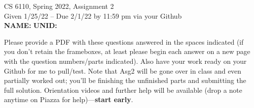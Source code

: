 \documentclass[11pt]{article}
\begin{document}



\begin{center}
\begin{large}
  CS 6110, Spring 2022, Assignment 2  \\
  Given 1/25/22 -- Due 2/1/22 by 11:59 pm via your Github 
  \ \\
    {  {\Large\bf NAME: } \hfill {\Large\bf UNID: }\hspace{4cm} }
          \ \\
\end{large}

\end{center}

Please provide a PDF with these questions answered
in the spaces indicated (if you don't retain the frameboxes,
at least please begin each answer on a new page
with the question numbers/parts indicated).
Also have your work ready on your Github for me to pull/test.
%
Note that Asg2 will be gone over in class and even partially
worked out; you'll be finishing the unfinished parts and submitting
the full solution.
%
Orientation videos and further help will be available (drop a note anytime
on Piazza for help)---{\bf start early}.
\end{document}
